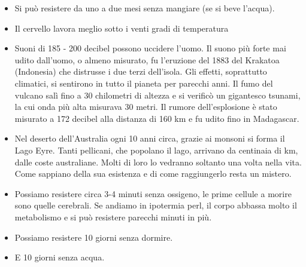 \documentclass[12pt]{book} %
\begin{document}
\begin{itemize}
\item Si può resistere da uno a due mesi senza mangiare (se si beve l'acqua).
\item Il cervello lavora meglio sotto i venti gradi di temperatura
\item Suoni di 185 - 200 decibel possono uccidere l'uomo. Il suono più forte mai udito
dall'uomo, o almeno misurato, fu l'eruzione del 1883 del Krakatoa (Indonesia) che distrusse i due
terzi dell'isola. Gli effetti, soprattutto climatici, si sentirono in tutto il pianeta per parecchi anni. Il fumo del
vulcano salì fino a 30 chilometri di altezza e si verificò un gigantesco tsunami, la cui onda più alta misurava 30
metri. Il rumore dell'esplosione è stato misurato a 172 decibel alla distanza di 160 km e fu udito
fino in Madagascar.
\item Nel deserto dell'Australia ogni 10 anni circa, grazie ai monsoni si forma il Lago Eyre. Tanti pellicani, che
popolano il lago, arrivano da centinaia di km, dalle coste australiane. Molti di loro lo vedranno soltanto una volta
nella vita. Come sappiano della sua esistenza e di come raggiungerlo resta un mistero. 
\item Possiamo resistere circa 3-4 minuti senza ossigeno, le prime cellule a morire sono quelle cerebrali. Se andiamo in
ipotermia perl, il corpo abbassa molto il metabolismo e si può resistere parecchi minuti in più.
\item Possiamo resistere 10 giorni senza dormire.
\item E 10 giorni senza acqua.
\end{itemize}

\theendnotes
\end{document}
